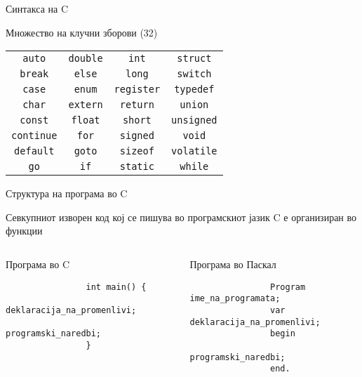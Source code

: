 \begin{frame}{Синтакса на C}

  	\begin{block}{Множество на клучни зборови (32)}

  	\begin{tabular}{c c c c}
		\texttt{auto} & \texttt{double} & \texttt{int} & \texttt{struct} \\
		\texttt{break} & \texttt{else} & \texttt{long} & \texttt{switch} \\
		\texttt{case} & \texttt{enum} & \texttt{register} & \texttt{typedef} \\
		\texttt{char} & \texttt{extern} & \texttt{return} & \texttt{union} \\
		\texttt{const} & \texttt{float} & \texttt{short} & \texttt{unsigned} \\
		\texttt{continue} & \texttt{for} & \texttt{signed} & \texttt{void} \\
		\texttt{default} & \texttt{goto} & \texttt{sizeof} & \texttt{volatile} \\
		\texttt{go} & \texttt{if} & \texttt{static} & \texttt{while}
  	\end{tabular}
  	\end{block}
\end{frame}

\begin{frame}[fragile]{Структура на програма во C}

	Севкупниот изворен код кој се пишува во програмскиот јазик C е организиран во функции
	\linebreak
	
	\begin{columns}[t]
			\begin{block}{Програма во C}
				\begin{lstlisting}
				int main() {
				    deklaracija_na_promenlivi;
				    programski_naredbi;
				}
				\end{lstlisting}
			\end{block}
			\begin{block}{Програма во Паскал}
				\begin{lstlisting}
				Program ime_na_programata;
				var deklaracija_na_promenlivi;
				begin
				    programski_naredbi;
				end.
				\end{lstlisting}
			\end{block}
	\end{columns}

\end{frame}

